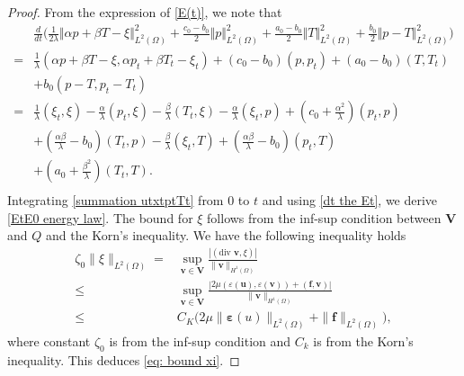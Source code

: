 \documentclass{article}
\numberwithin{equation}{section}
\begin{document}
\begin{proof}
From the expression of \eqref{E(t)}, we note that
\begin{equation} \label{dt the Et}
\begin{aligned} 
  &\frac{d}{dt}\Big( \frac1{2\lambda}\Vert\alpha p+\beta T-\xi\Vert_{L^2(\Omega)}^2
  +\frac{c_0-b_0}{2}\Vert p\Vert_{L^2(\Omega)}^2
  +\frac{a_0-b_0}{2}\Vert T\Vert_{L^2(\Omega)}^2+\frac{b_0}{2}\Vert p-T\Vert_{L^2(\Omega)}^2
 \Big)\\
 =&\frac1\lambda(\alpha p+\beta T-\xi,\alpha p_t+\beta T_t- \xi_t)
 +(c_0-b_0)(p, p_t)+(a_0-b_0)(T, T_t)\\
 &+b_0(p-T, p_t- T_t)
 \\
 =&\frac{1}{\lambda}( \xi_t,\xi)-\frac{\alpha}{\lambda}( p_t,\xi)-\frac{\beta}{\lambda}( T_t,\xi) 
  -\frac\alpha\lambda( \xi_t ,p)
  +(c_0+\frac{\alpha^2}{\lambda})( p_t ,p) \\
&  + (\frac{\alpha\beta}{\lambda}-b_0)( T_t ,p) 
  -\frac\beta\lambda( \xi_t ,T)
  +(\frac{\alpha\beta}{\lambda}-b_0)( p_t ,T)\\
&  +(a_0+\frac{\beta^2}{\lambda})( T_t ,T).   
  \\ 
\end{aligned}
\end{equation} 
Integrating \eqref{summation utxtptTt} from $0$ to $t$ and using \eqref{dt the Et}, we derive \eqref{EtE0 energy law}.
The bound for $\xi$ follows from the inf-sup condition between $\bm V$ and $Q$ and the Korn's inequality. We have the following inequality holds
\begin{equation}\label{eq:bound xi proof}
\begin{aligned} 
\zeta_0\| \xi\|_{L^2(\Omega)}
         =&\sup_{\bm v\in\bm V}\frac{|(\text{div }\bm v,\xi)|}{\|\bm v\|_{H^1(\Omega)}}\\
  \le&\sup_{\bm v\in\bm V}\frac{ | 2\mu(\varepsilon(\bm u),\varepsilon(\bm v)) +(\bm f,\bm  v)|}
           {\|\bm v\|_{H^1(\Omega)}}\\
  \le& C_K\big(  2\mu\|\bm \varepsilon(u)\|_{L^2(\Omega)}   +\|\bm f\|_{L^2(\Omega)}   \big),      
\end{aligned}
\end{equation} 
where constant $\zeta_0$ is from the inf-sup condition  and $C_k$ is from the Korn’s
inequality. This deduces \eqref{eq: bound xi}. 
\end{proof}
\end{document}
